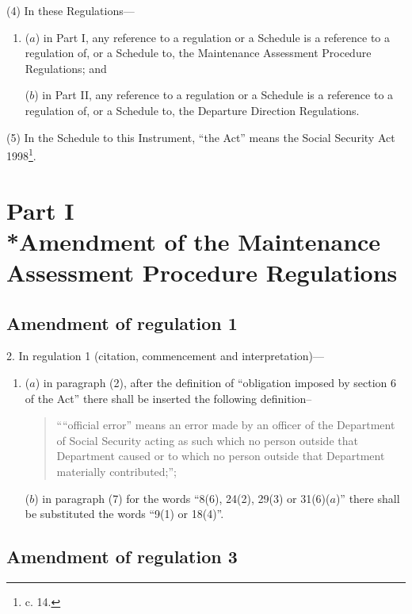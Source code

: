 \documentclass[12pt,a4paper]{article}
\begin{document}
(4) In these Regulations---
\begin{enumerate}\item[]
($a$) in Part I, any reference to a regulation or a Schedule is a reference to a regulation of, or a Schedule to, the Maintenance Assessment Procedure Regulations; and

($b$) in Part II, any reference to a regulation or a Schedule is a reference to a regulation of, or a Schedule to, the Departure Direction Regulations.
\end{enumerate}

(5) In the Schedule to this Instrument, “the Act” means the Social Security Act 1998\footnote{ c. 14.}.

\section[Part I --- Amendment of the Maintenance Assessment Procedure Regulations]{Part I\\*Amendment of the Maintenance Assessment Procedure Regulations}

\renewcommand\parthead{--- Part I}

\subsection[2. Amendment of regulation 1]{Amendment of regulation 1}

2.  In regulation 1 (citation, commencement and interpretation)---
\begin{enumerate}\item[]
($a$) in paragraph (2), after the definition of “obligation imposed by section 6 of the Act” there shall be inserted the following definition–
\begin{quotation}
““official error” means an error made by an officer of the Department of Social Security acting as such which no person outside that Department caused or to which no person outside that Department materially contributed;”;
\end{quotation}

($b$) in paragraph (7) for the words “8(6), 24(2), 29(3) or 31(6)($a$)” there shall be substituted the words “9(1) or 18(4)”.
\end{enumerate}

\subsection[3. Amendment of regulation 3]{Amendment of regulation 3}
\end{document}
